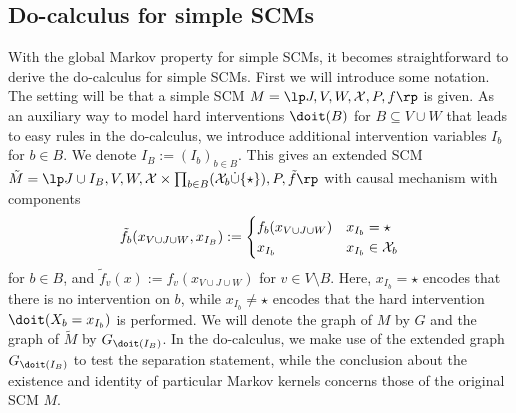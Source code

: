 
\subsection{Do-calculus for simple SCMs}


With the global Markov property for simple SCMs, it becomes straightforward to derive the do-calculus for simple SCMs.
First we will introduce some notation. The setting will be that a simple SCM $M = \lt \Sin, \Send, \Srnd, \CX, P, f \rt$
is given. 
As an auxiliary way to model hard interventions $\doit(B)$ for $B \subseteq V \cup W$  that leads to easy rules in the
do-calculus, we introduce additional intervention variables
$I_b$ for $b \in B$. We denote $I_B := (I_b)_{b \in B}$.
This gives an extended SCM $\tilde{M} = \lt \Sin \cup I_B, \Send, \Srnd, \CX \times \prod_{b \in B} (\CX_b \dot\cup \{\star\}), P, \tilde{f} \rt$ with causal mechanism with components
$$\tilde{f}_b(x_{V \cup J \cup W},x_{I_B}) := \begin{cases}
  f_b(x_{V \cup J \cup W}) & x_{I_b} = \star \\
  x_{I_b} & x_{I_b} \in \mathcal{X}_b
\end{cases}$$
for $b \in B$, and $\tilde{f}_v(x) := f_v(x_{V \cup J \cup W})$ for $v \in V \setminus B$.
Here, $x_{I_b} = \star$ encodes that there is no intervention on $b$, 
while $x_{I_b} \ne \star$ encodes that the hard intervention $\doit(X_b = x_{I_b})$ is performed.
We will denote the graph of $M$ by $G$ and the graph of $\tilde{M}$ by $G_{\doit(I_B)}$.
In the do-calculus, we make use of the extended graph $G_{\doit(I_B)}$ to test the separation statement, while the conclusion
about the existence and identity of particular Markov kernels concerns those of the original SCM $M$.

